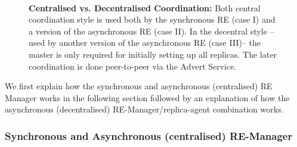 \documentclass{rspublic}
\newcommand{\jhanote}[1]{ {\textcolor{red} { ***shantenu: #1 }}}
\newcommand{\jhanote}[1]{}
\begin{document}
\begin{figure}%
\centering
{}\qquad
{}\\
\caption{\textbf{Centralised vs. Decentralised Coordination:} Both
  central coordination style is used both by the synchronous RE (case
  I) and a version of the asynchronous RE (case II).  In the decentral
  style -- used by another version of the asynchronous RE (case III)--
  the master is only required for initially setting up all
  replicas. The later coordination is done peer-to-peer via the Advert
  Service.}
\label{fig:coordination}
\end{figure}


We first explain how the synchronous and asynchronous (centralised) RE
Manager works in the following section followed by an explanation of
how the asynchronous (decentralised) RE-Manager/replica-agent
combination works.

\subsubsection{Synchronous and Asynchronous (centralised) RE-Manager}
\end{document}
